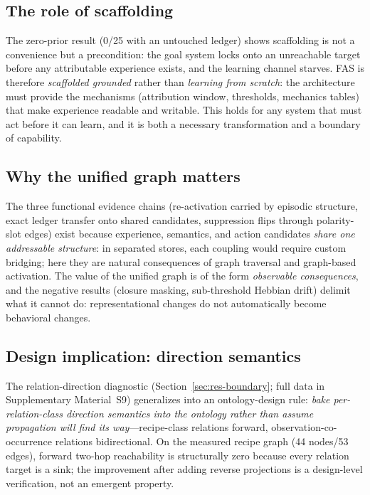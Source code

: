 \documentclass[10pt,a4paper]{article}
\begin{document}
\subsection{The role of scaffolding}
The zero-prior result (0/25 with an untouched ledger) shows scaffolding is not a convenience but a precondition: the goal system locks onto an unreachable target before any attributable experience exists, and the learning channel starves. FAS is therefore \emph{scaffolded grounded} rather than \emph{learning from scratch}: the architecture must provide the mechanisms (attribution window, thresholds, mechanics tables) that make experience readable and writable. This holds for any system that must act before it can learn, and it is both a necessary transformation and a boundary of capability.

\subsection{Why the unified graph matters}
The three functional evidence chains (re-activation carried by episodic structure, exact ledger transfer onto shared candidates, suppression flips through polarity-slot edges) exist because experience, semantics, and action candidates \emph{share one addressable structure}: in separated stores, each coupling would require custom bridging; here they are natural consequences of graph traversal and graph-based activation. The value of the unified graph is of the form \emph{observable consequences}, and the negative results (closure masking, sub-threshold Hebbian drift) delimit what it cannot do: representational changes do not automatically become behavioral changes.

\subsection{Design implication: direction semantics}
The relation-direction diagnostic (Section~\ref{sec:res-boundary}; full data in Supplementary Material~S9) generalizes into an ontology-design rule: \emph{bake per-relation-class direction semantics into the ontology rather than assume propagation will find its way}---recipe-class relations forward, observation-co-occurrence relations bidirectional. On the measured recipe graph (44 nodes/53 edges), forward two-hop reachability is structurally zero because every relation target is a sink; the improvement after adding reverse projections is a design-level verification, not an emergent property.
\end{document}
